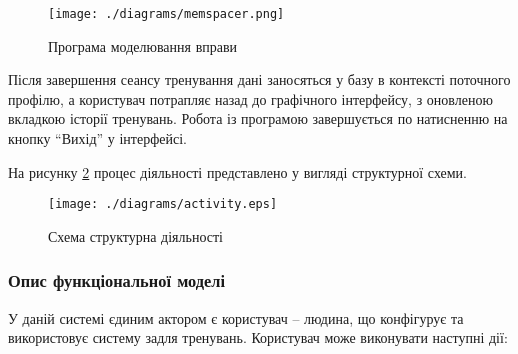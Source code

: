 \begin{figure}[here]
  \centering\texttt{[image: ./diagrams/memspacer.png]}
  \caption{Програма моделювання вправи}
  \label{fig:memspacer}
\end{figure}

Після завершення сеансу тренування дані заносяться у базу в контексті поточного профілю, а користувач потрапляє назад до графічного інтерфейсу, з оновленою вкладкою історії тренувань. Робота із програмою завершується по натисненню на кнопку ``Вихід'' у інтерфейсі.

На рисунку \ref{fig:activity} процес діяльності представлено у вигляді структурної схеми.

\begin{figure}[here]
  \centering\texttt{[image: ./diagrams/activity.eps]}
  \caption{Схема структурна діяльності}
  \label{fig:activity}
\end{figure}

\subsubsection{Опис функціональної моделі}

У даній системі єдиним актором є користувач -- людина, що конфігурує та використовує систему задля тренувань. Користувач може виконувати наступні дії:

